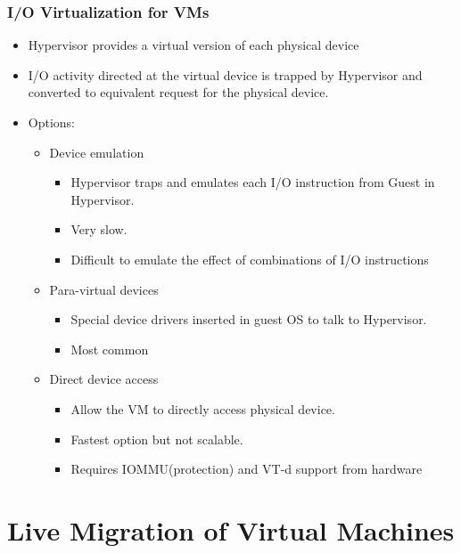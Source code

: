 \documentclass[12pt]{article}
\begin{document}
\subsubsection{I/O Virtualization for VMs}
\begin{itemize}
    \item Hypervisor provides a virtual version of each physical device
    \item I/O activity directed at the virtual device is trapped by Hypervisor and converted to equivalent request for the physical device.
    \item Options: \begin{itemize}
        \item Device emulation \begin{itemize}
            \item Hypervisor traps and emulates each I/O instruction from Guest in Hypervisor. 
            \item Very slow.
            \item Difficult to emulate the effect of combinations of I/O instructions
        \end{itemize}
        \item Para-virtual devices \begin{itemize}
            \item Special device drivers inserted in guest OS to talk to Hypervisor. 
            \item Most common
        \end{itemize}
        \item Direct device access \begin{itemize}
            \item Allow the VM to directly access physical device. 
            \item Fastest option but not scalable.
            \item Requires IOMMU(protection) and VT-d support from hardware
        \end{itemize}
    \end{itemize}
\end{itemize}

\section{Live Migration of Virtual Machines}
\end{document}
